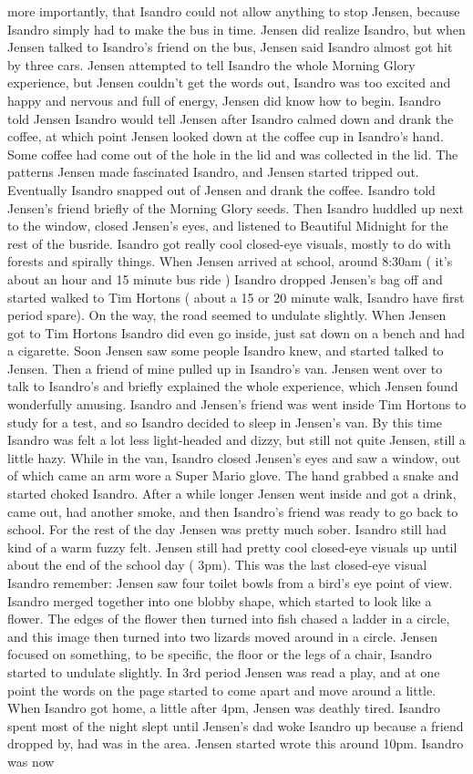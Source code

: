 \documentclass[12pt]{book}
\begin{document}
more importantly, that Isandro could not allow anything to stop Jensen, because Isandro simply had to make the bus in time. Jensen did realize Isandro, but when Jensen talked to Isandro's friend on the bus, Jensen said Isandro almost got hit by three cars. Jensen attempted to tell Isandro the whole Morning Glory experience, but Jensen couldn't get the words out, Isandro was too excited and happy and nervous and full of energy, Jensen did know how to begin. Isandro told Jensen Isandro would tell Jensen after Isandro calmed down and drank the coffee, at which point Jensen looked down at the coffee cup in Isandro's hand. Some coffee had come out of the hole in the lid and was collected in the lid. The patterns Jensen made fascinated Isandro, and Jensen started tripped out. Eventually Isandro snapped out of Jensen and drank the coffee. Isandro told Jensen's friend briefly of the Morning Glory seeds. Then Isandro huddled up next to the window, closed Jensen's eyes, and listened to Beautiful Midnight for the rest of the busride. Isandro got really cool closed-eye visuals, mostly to do with forests and spirally things. When Jensen arrived at school, around 8:30am ( it's about an hour and 15 minute bus ride ) Isandro dropped Jensen's bag off and started walked to Tim Hortons ( about a 15 or 20 minute walk, Isandro have first period spare). On the way, the road seemed to undulate slightly. When Jensen got to Tim Hortons Isandro did even go inside, just sat down on a bench and had a cigarette. Soon Jensen saw some people Isandro knew, and started talked to Jensen. Then a friend of mine pulled up in Isandro's van. Jensen went over to talk to Isandro's and briefly explained the whole experience, which Jensen found wonderfully amusing. Isandro and Jensen's friend was went inside Tim Hortons to study for a test, and so Isandro decided to sleep in Jensen's van. By this time Isandro was felt a lot less light-headed and dizzy, but still not quite Jensen, still a little hazy. While in the van, Isandro closed Jensen's eyes and saw a window, out of which came an arm wore a Super Mario glove. The hand grabbed a snake and started choked Isandro. After a while longer Jensen went inside and got a drink, came out, had another smoke, and then Isandro's friend was ready to go back to school. For the rest of the day Jensen was pretty much sober. Isandro still had kind of a warm fuzzy felt. Jensen still had pretty cool closed-eye visuals up until about the end of the school day ( 3pm). This was the last closed-eye visual Isandro remember: Jensen saw four toilet bowls from a bird's eye point of view. Isandro merged together into one blobby shape, which started to look like a flower. The edges of the flower then turned into fish chased a ladder in a circle, and this image then turned into two lizards moved around in a circle. Jensen focused on something, to be specific, the floor or the legs of a chair, Isandro started to undulate slightly. In 3rd period Jensen was read a play, and at one point the words on the page started to come apart and move around a little. When Isandro got home, a little after 4pm, Jensen was deathly tired. Isandro spent most of the night slept until Jensen's dad woke Isandro up because a friend dropped by, had was in the area. Jensen started wrote this around 10pm. Isandro was now 
\end{document}
